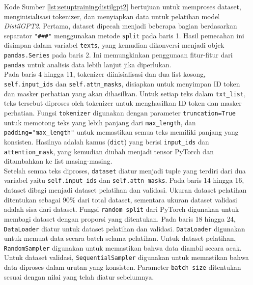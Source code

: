 \begin{enumerate}[topsep=0pt]
\begin{itemize}
      

      Kode Sumber \ref{lst:setuptrainingdistilgpt2} bertujuan untuk memproses dataset, menginisialisasi tokenizer, dan menyiapkan data untuk pelatihan model \emph{DistilGPT2}. 
      Pertama, dataset dipecah menjadi beberapa bagian berdasarkan separator \texttt{"\#\#\#"} menggunakan metode \texttt{split} pada baris 1. Hasil pemecahan ini disimpan dalam variabel \texttt{texts}, yang kemudian dikonversi menjadi objek \texttt{pandas.Series} pada baris 2. Ini memungkinkan penggunaan fitur-fitur dari \texttt{pandas} untuk analisis data lebih lanjut jika diperlukan.
      \\

      Pada baris 4 hingga 11, tokenizer diinisialisasi dan dua list kosong, \texttt{self.input\_ids} dan \texttt{self.attn\_masks}, disiapkan untuk menyimpan ID token dan masker perhatian yang akan dihasilkan. Untuk setiap teks dalam \texttt{txt\_list}, teks tersebut diproses oleh tokenizer untuk menghasilkan ID token dan masker perhatian. Fungsi \texttt{tokenizer} digunakan dengan parameter \texttt{truncation=True} untuk memotong teks yang lebih panjang dari \texttt{max\_length}, dan \texttt{padding="max\_length"} untuk memastikan semua teks memiliki panjang yang konsisten. Hasilnya adalah kamus (\texttt{dict}) yang berisi \texttt{input\_ids} dan \texttt{attention\_mask}, yang kemudian diubah menjadi tensor PyTorch dan ditambahkan ke list masing-masing.
      \\

      Setelah semua teks diproses, \texttt{dataset} diatur menjadi tuple yang terdiri dari dua variabel yaitu \texttt{self.input\_ids} dan \texttt{self.attn\_masks}. Pada baris 14 hingga 16, dataset dibagi menjadi dataset pelatihan dan validasi. Ukuran dataset pelatihan ditentukan sebagai 90\% dari total dataset, sementara ukuran dataset validasi adalah sisa dari dataset. Fungsi \texttt{random\_split} dari PyTorch digunakan untuk membagi dataset dengan proporsi yang ditentukan.
      Pada baris 18 hingga 24, \texttt{DataLoader} diatur untuk dataset pelatihan dan validasi. \texttt{DataLoader} digunakan untuk memuat data secara batch selama pelatihan. Untuk dataset pelatihan, \texttt{RandomSampler} digunakan untuk memastikan bahwa data diambil secara acak. Untuk dataset validasi, \texttt{SequentialSampler} digunakan untuk memastikan bahwa data diproses dalam urutan yang konsisten. Parameter \texttt{batch\_size} ditentukan sesuai dengan nilai yang telah diatur sebelumnya.
      \\


\end{itemize}
\end{enumerate}
